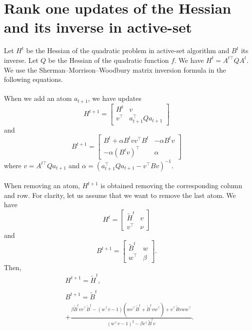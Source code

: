 \documentclass[twoside]{article}
\begin{document}
\section{Rank one updates of the Hessian and its inverse in active-set}
Let  $H^{t}$ be the Hessian of the quadratic problem in active-set algorithm and $B^{t}$ its inverse. Let $Q$ be the Hessian of the quadratic function $f$. We have $H^{t}=A^{t\top}QA^{t}$. We use the Sherman–Morrison–Woodbury matrix inversion formula in the following equations.\\
\\
When we add an atom $a_{t+1}$, we have updates
$$
H^{t+1}=
\begin{bmatrix} 
H^{t} & v \\
v^{\top} & a_{t+1}^{\top}Qa_{t+1}
\end{bmatrix}
$$
and
$$
B^{t+1}=
\begin{bmatrix} 
B^{t}+\alpha B^{t}vv^{\top}B^{t} & -\alpha B^{t}v\\
-\alpha(B^{t}v)^{\top}& \alpha
\end{bmatrix}
$$
where $v=A^{t\top}Qa_{t+1}$ and $\alpha=(a_{t+1}^{\top}Qa_{t+1}-v^{\top}Bv)^{-1}$.\\
\\
When removing an atom, $H^{t+1}$ is obtained removing the corresponding column and row. For clarity, let us assume that we want to remove the last atom. We have
$$
H^{t}=
\begin{bmatrix} 
\tilde{H}^{t} & v \\
v^{\top} & \nu
\end{bmatrix}
$$
and
$$
B^{t+1}=
\begin{bmatrix} 
\tilde{B}^{t} & w\\
w^{\top}& \beta
\end{bmatrix}.
$$
Then,
\begin{align*}
&H^{t+1}=\tilde{H}^{t}, \\
\\
&B^{t+1} =\tilde{B}^{t} \\
		&+\frac{\beta \tilde{B}^{t}vv^{\top}\tilde{B}^{t}-(w^{\top}v-1)(wv^{\top}\tilde{B}^{t}+ \tilde{B}^{t}vw^{\top}) + v^{\top}\tilde{B}vww^{\top}}{(w^{\top}v-1)^2 - \beta v^{\top}\tilde{B}^{t}v}.\\
\end{align*}





\end{document}

